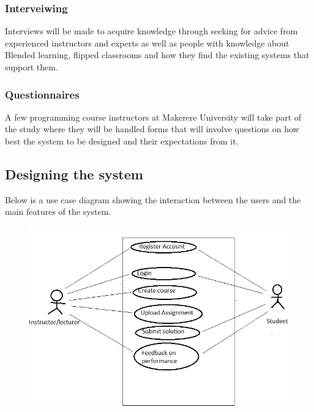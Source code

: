 \documentclass[12pt]{article}
\begin{document}
		\subsubsection{Interveiwing}
			Interviews will be made to acquire knowledge through seeking for advice from experienced instructors and experts as well as people with knowledge about Blended learning, flipped classrooms and how they find the existing systems that support them.
		\subsubsection{Questionnaires}
			A few programming course instructors at Makerere University will take part of the study where they will be handled forms that will involve questions on how best the system to be designed and their expectations from it. 

	\subsection{Designing the  system}
		Below is a use case diagram showing the interaction between the users and the main features of the system.
		
		\begin{figure}[H]
			\begin{center} \includegraphics[width=1\linewidth]{usecase.PNG} \end{center}
		\end{figure}
\end{document}
